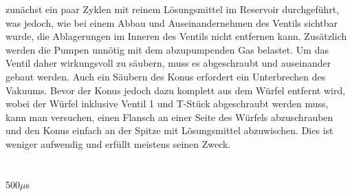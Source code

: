 zunächst ein paar Zyklen mit reinem Lösungsmittel im Reservoir durchgeführt, was jedoch, wie bei
einem Abbau und Auseinandernehmen des Ventils sichtbar wurde, die Ablagerungen im Inneren des
Ventils nicht entfernen kann. Zusätzlich werden die Pumpen unnötig mit dem abzupumpenden Gas
belastet. Um das Ventil daher wirkungsvoll zu säubern, muss es abgeschraubt und auseinander gebaut
werden. Auch ein Säubern des Konus erfordert ein Unterbrechen des Vakuums. Bevor der Konus jedoch
dazu komplett aus dem Würfel entfernt wird, wobei der Würfel inklusive Ventil 1 und T-Stück
abgeschraubt werden muss, kann man versuchen, einen Flansch an einer Seite des Würfels abzuschrauben
und den Konus einfach an der Spitze mit Lösungsmittel abzuwischen. Dies ist weniger aufwendig und
erfüllt meistens seinen Zweck.\\


\\
\\
 500$\mu$s
 































